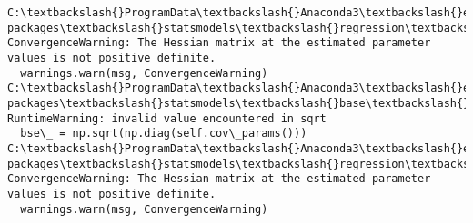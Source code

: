 \documentclass[11pt]{article}
\begin{document}
    \begin{Verbatim}[commandchars=\\\{\}]
C:\textbackslash{}ProgramData\textbackslash{}Anaconda3\textbackslash{}envs\textbackslash{}allennlp\textbackslash{}lib\textbackslash{}site-packages\textbackslash{}statsmodels\textbackslash{}regression\textbackslash{}mixed\_linear\_model.py:2066: ConvergenceWarning: The Hessian matrix at the estimated parameter values is not positive definite.
  warnings.warn(msg, ConvergenceWarning)
C:\textbackslash{}ProgramData\textbackslash{}Anaconda3\textbackslash{}envs\textbackslash{}allennlp\textbackslash{}lib\textbackslash{}site-packages\textbackslash{}statsmodels\textbackslash{}base\textbackslash{}model.py:1092: RuntimeWarning: invalid value encountered in sqrt
  bse\_ = np.sqrt(np.diag(self.cov\_params()))
C:\textbackslash{}ProgramData\textbackslash{}Anaconda3\textbackslash{}envs\textbackslash{}allennlp\textbackslash{}lib\textbackslash{}site-packages\textbackslash{}statsmodels\textbackslash{}regression\textbackslash{}mixed\_linear\_model.py:2066: ConvergenceWarning: The Hessian matrix at the estimated parameter values is not positive definite.
  warnings.warn(msg, ConvergenceWarning)

    \end{Verbatim}
\end{document}

